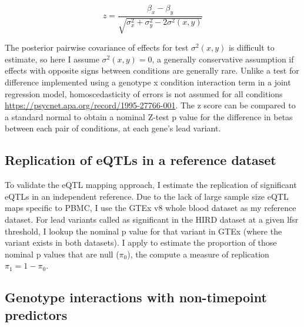 \begin{equation}
z = \frac{\beta_x - \beta_y}{\sqrt{\sigma_x^2 + \sigma_y^2 - 2\sigma^2(x, y)}}
\end{equation}

The posterior pairwise covariance of effects for test $\sigma^2(x, y)$ is difficult to estimate, so here I assume $\sigma^2(x, y) = 0$, a generally conservative assumption if effects with opposite signs between conditions are generally rare.
Unlike a test for difference implemented using a genotype x condition interaction term in a joint regression model, homoscedasticity of errors is not assumed for all conditions \url{https://psycnet.apa.org/record/1995-27766-001}.
The z score can be compared to a standard normal to obtain a nominal Z-test p value for the difference in betas between each pair of conditions, at each gene's lead variant.

\subsection{Replication of eQTLs in a reference dataset}

To validate the \gls{eQTL} mapping approach, I estimate the replication of significant eQTLs in an independent reference.
Due to the lack of large sample size \gls{eQTL} maps specific to \gls{PBMC}, I use the GTEx v8 whole blood dataset as my reference dataset.
For lead variants called as significant in the \gls{HIRD} dataset at a given lfsr threshold, I lookup the nominal p value for that variant in GTEx (where the variant exists in both datasets).
I apply  to estimate the proportion of those nominal p values that are null ($\pi_0$), the compute a measure of replication $\pi_1 = 1 - \pi_0$.

\subsection{Genotype interactions with non-timepoint predictors}


